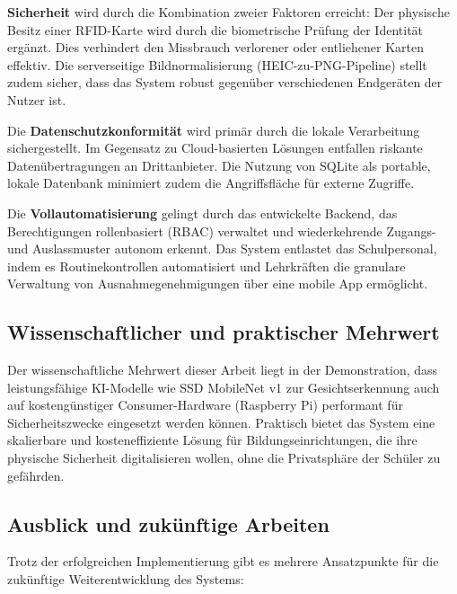 \textbf{Sicherheit} wird durch die Kombination zweier Faktoren erreicht: Der physische Besitz einer RFID-Karte wird durch die biometrische Prüfung der Identität ergänzt. Dies verhindert den Missbrauch verlorener oder entliehener Karten effektiv. Die serverseitige Bildnormalisierung (HEIC-zu-PNG-Pipeline) stellt zudem sicher, dass das System robust gegenüber verschiedenen Endgeräten der Nutzer ist.

Die \textbf{Datenschutzkonformität} wird primär durch die lokale Verarbeitung sichergestellt. Im Gegensatz zu Cloud-basierten Lösungen entfallen riskante Datenübertragungen an Drittanbieter. Die Nutzung von SQLite als portable, lokale Datenbank minimiert zudem die Angriffsfläche für externe Zugriffe.

Die \textbf{Vollautomatisierung} gelingt durch das entwickelte Backend, das Berechtigungen rollenbasiert (RBAC) verwaltet und wiederkehrende Zugangs- und Auslassmuster autonom erkennt. Das System entlastet das Schulpersonal, indem es Routinekontrollen automatisiert und Lehrkräften die granulare Verwaltung von Ausnahmegenehmigungen über eine mobile App ermöglicht.

\subsection{Wissenschaftlicher und praktischer Mehrwert} \label{subsec:mehrwert}

Der wissenschaftliche Mehrwert dieser Arbeit liegt in der Demonstration, dass leistungsfähige KI-Modelle wie SSD MobileNet v1 zur Gesichtserkennung auch auf kostengünstiger Consumer-Hardware (Raspberry Pi) performant für Sicherheitszwecke eingesetzt werden können. Praktisch bietet das System eine skalierbare und kosteneffiziente Lösung für Bildungseinrichtungen, die ihre physische Sicherheit digitalisieren wollen, ohne die Privatsphäre der Schüler zu gefährden.

\subsection{Ausblick und zukünftige Arbeiten} \label{subsec:ausblick}

Trotz der erfolgreichen Implementierung gibt es mehrere Ansatzpunkte für die zukünftige Weiterentwicklung des Systems:


